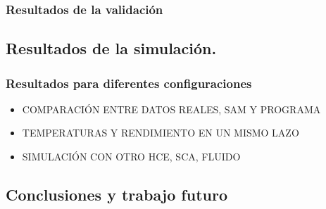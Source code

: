 \hypertarget{resultados-de-la-validaciuxf3n}{%
\subsubsection{Resultados de la
validación}\label{resultados-de-la-validaciuxf3n}}

    \hypertarget{resultados-de-la-simulaciuxf3n.}{%
\subsection{Resultados de la
simulación.}\label{resultados-de-la-simulaciuxf3n.}}

\hypertarget{resultados-para-diferentes-configuraciones}{%
\subsubsection{Resultados para diferentes
configuraciones}\label{resultados-para-diferentes-configuraciones}}

\begin{itemize}
\tightlist
\item
  COMPARACIÓN ENTRE DATOS REALES, SAM Y PROGRAMA
\item
  TEMPERATURAS Y RENDIMIENTO EN UN MISMO LAZO
\item
  SIMULACIÓN CON OTRO HCE, SCA, FLUIDO
\end{itemize}

\hypertarget{conclusiones-y-trabajo-futuro}{%
\subsection{Conclusiones y trabajo
futuro}\label{conclusiones-y-trabajo-futuro}}

    


